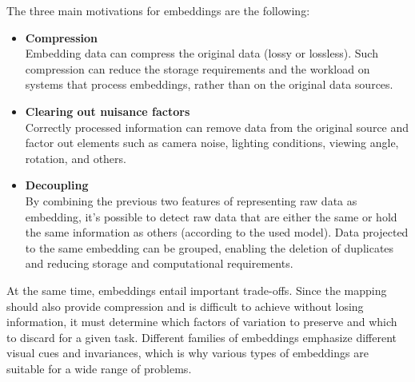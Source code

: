 The three main motivations for embeddings are the following:
\begin{itemize}
    \item \textbf{Compression} \\
    Embedding data can compress the original data (lossy or lossless). Such compression can reduce the storage requirements and the workload on systems that process embeddings, rather than on the original data sources.
    \item \textbf{Clearing out nuisance factors} \\
    Correctly processed information can remove data from the original source and factor out elements such as camera noise, lighting conditions, viewing angle, rotation, and others.
    \item \textbf{Decoupling} \\
    By combining the previous two features of representing raw data as embedding, it's possible to detect raw data that are either the same or hold the same information as others (according to the used model). Data projected to the same embedding can be grouped, enabling the deletion of duplicates and reducing storage and computational requirements.
    
    \cite{torralba_foundations_2024}
\end{itemize}

At the same time, embeddings entail important trade-offs. Since the mapping should also provide compression and is difficult to achieve without losing information, it must determine which factors of variation to preserve and which to discard for a given task. Different families of embeddings emphasize different visual cues and invariances, which is why various types of embeddings are suitable for a wide range of problems.

